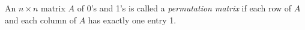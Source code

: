 An $n \times n$ matrix $A$ of 0's and 1's is called a \textit{permutation matrix} if each row of $A$ and each column of $A$ has exactly one entry 1.
